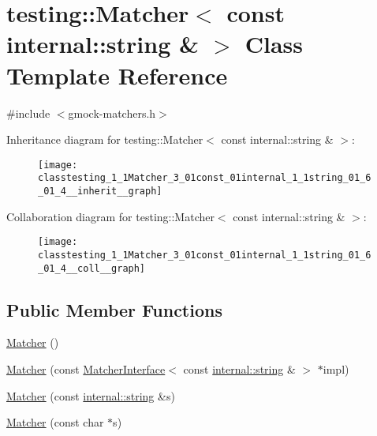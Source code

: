\hypertarget{classtesting_1_1Matcher_3_01const_01internal_1_1string_01_6_01_4}{}\section{testing\+:\+:Matcher$<$ const internal\+:\+:string \& $>$ Class Template Reference}
\label{classtesting_1_1Matcher_3_01const_01internal_1_1string_01_6_01_4}


{\ttfamily \#include $<$gmock-\/matchers.\+h$>$}



Inheritance diagram for testing\+:\+:Matcher$<$ const internal\+:\+:string \& $>$\+:
\nopagebreak
\begin{figure}[H]
\begin{center}
\leavevmode
\texttt{[image: classtesting\_1\_1Matcher\_3\_01const\_01internal\_1\_1string\_01\_6\_01\_4\_\_inherit\_\_graph]}
\end{center}
\end{figure}


Collaboration diagram for testing\+:\+:Matcher$<$ const internal\+:\+:string \& $>$\+:
\nopagebreak
\begin{figure}[H]
\begin{center}
\leavevmode
\texttt{[image: classtesting\_1\_1Matcher\_3\_01const\_01internal\_1\_1string\_01\_6\_01\_4\_\_coll\_\_graph]}
\end{center}
\end{figure}
\subsection*{Public Member Functions}
\begin{DoxyCompactItemize}
\item 
\hyperlink{classtesting_1_1Matcher_3_01const_01internal_1_1string_01_6_01_4_a0385eac840bb8fd52c93c51c2687dd6f}{Matcher} ()
\item 
\hyperlink{classtesting_1_1Matcher_3_01const_01internal_1_1string_01_6_01_4_a45670b268a87239be6520c1b0fbe015e}{Matcher} (const \hyperlink{classtesting_1_1MatcherInterface}{Matcher\+Interface}$<$ const \hyperlink{namespacetesting_1_1internal_a8e8ff5b11e64078831112677156cb111}{internal\+::string} \& $>$ $\ast$impl)
\item 
\hyperlink{classtesting_1_1Matcher_3_01const_01internal_1_1string_01_6_01_4_a3414bb154dfc4d19818a0c7878d662f4}{Matcher} (const \hyperlink{namespacetesting_1_1internal_a8e8ff5b11e64078831112677156cb111}{internal\+::string} \&s)
\item 
\hyperlink{classtesting_1_1Matcher_3_01const_01internal_1_1string_01_6_01_4_a7a98217eaa834207c4e51bb6d5283ed6}{Matcher} (const char $\ast$s)
\end{DoxyCompactItemize}
